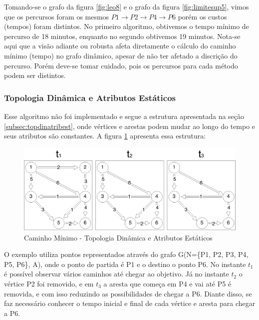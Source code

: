 Tomando-se o grafo da figura \ref{fig:leo8} e o grafo da figura \ref{fig:limitesup5}, vimos que os percursos
foram os mesmos $P1 \rightarrow P2 \rightarrow P4 \rightarrow P6$ porém os custos (tempos) foram distintos.
No primeiro algoritmo, obtivemos o tempo mínimo de percurso de 18 minutos, enquanto no segundo obtivemos 19 minutos.
Nota-se aqui que a visão adiante ou robusta afeta diretamente o cálculo do caminho mínimo (tempo) no grafo dinâmico,
apesar de não ter afetado a discrição do percurso.
Porém deve-se tomar cuidado, pois os percursos para cada método podem ser distintos.


\subsubsection{Topologia Dinâmica e Atributos Estáticos}
Esse algoritmo não foi implementado e segue a estrutura apresentada na seção \ref{subsec:topdinatribest},
onde vértices e arestas podem mudar ao longo do tempo e seus atributos são constantes. A 
figura \ref{fig:pathtopdyn} apresenta essa estrutura:

\begin{figure}[htbp]
\centering
 \includegraphics[width=.80\textwidth]{chapters/fig/pathtopdyn.png}
\caption{Caminho Mínimo - Topologia Dinâmica e Atributos Estáticos}
\label{fig:pathtopdyn}
\end{figure}
\FloatBarrier
O exemplo utiliza pontos representados através do grafo G(N=\{P1, P2, P3, P4, P5, P6\}, A), onde o 
ponto de partida é P1 e o destino o ponto P6. No instante $t_1$ é possível observar vários caminhos
até chegar ao objetivo. Já no instante $t_2$ o vértice P2 foi removido, e em $t_3$ a aresta que começa em
P4 e vai até P5 é removida, e com isso reduzindo as possibilidades de chegar a P6. Diante disso,
se faz necessário conhecer o tempo inicial e final de cada vértice e aresta para chegar a P6.


